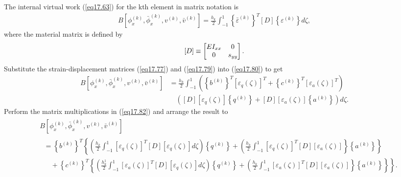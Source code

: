 \documentclass{AeroStructure-ERJohnson}
\begin{document}
The internal virtual work (\ref{eq17.63}) for the kth element in matrix notation is
\begin{align}\label{eq17.80}
B\left[\phi_{x}^{(k)}, \bar{\phi}_{x}^{(k)}, v^{(k)}, \bar{v}^{(k)}\right]=\frac{h_{k}}{2} \int_{-1}^{1}\left\{\bar{\varepsilon}^{(k)}\right\}^{T}[D]\left\{\varepsilon^{(k)}\right\} d \zeta,
\end{align}
where the material matrix is defined by\vspace*{-4pt}
\begin{align}\label{eq17.81}
[D] \equiv\left[\begin{array}{@{}cc@{}}E I_{x x} & 0 \\0 & s_{y y}\end{array}\right].
\end{align}
Substitute the strain-displacement matrices (\ref{eq17.77}) and (\ref{eq17.79}) into (\ref{eq17.80}) to get
\begin{align}
B\left[\phi_{x}^{(k)}, \bar{\phi}_{x}^{(k)}, v^{(k)}, \bar{v}^{(k)}\right] &=\frac{h_{k}}{2} \int_{-1}^{1}\left(\left\{b^{(k)}\right\}^{T}\left[\varepsilon_{q}(\zeta)\right]^{T}+\left\{c^{(k)}\right\}^{T}\left[\varepsilon_{a}(\zeta)\right]^{T}\right)\nonumber \\
&\quad\left([D]\left[\varepsilon_{q}(\zeta)\right]\left\{q^{(k)}\right\}  +[D]\left[\varepsilon_{a}(\zeta)\right]\left\{a^{(k)}\right\}\right) d \zeta. \label{eq17.82}
\end{align}
Perform the matrix multiplications in (\ref{eq17.82}) and arrange the result to
\begin{align}\label{eq17.83}
&\begin{array}{rl}B\left[\phi_{x}^{(k)}, \bar{\phi}_{x}^{(k)}, v^{(k)}, \bar{v}^{(k)}\right]\end{array}\nonumber\\
&\quad =
\left\{b^{(k)}\right\}^{T}\left\{\left(\frac{h_{k}}{2} \int^{1}_{-1}\left[\varepsilon_{q}(\zeta)\right]^{T}[D]\left[\varepsilon_{q}(\zeta)\right] d \zeta\right)\left\{q^{(k)}\right\}+\left(\frac{h_{k}}{2} \int^{1}_{-1}\left[\varepsilon_{q}(\zeta)\right]^{T}[D]\left[\varepsilon_{a}(\zeta)\right]\right\}\left\{a^{(k)}\right\}\right\} \nonumber\\
&\quad\quad\!\!+ \left. \left\{c^{(k)}\right\}^{T}\left\{\left(\frac{h_{k}^{1}}{2} \int^{1}_{-1}\left[\varepsilon_{a}(\zeta)\right]^{T}[D]\left[\varepsilon_{q}(\zeta)\right] d \zeta\right)\left\{q^{(k)}\right\}+\left(\frac{h_{k}}{2} \int^{1}_{-1}\left[\varepsilon_{a}(\zeta)\right]^{T}[D]\left[\varepsilon_{a}(\zeta)\right]\right\}\left\{a^{(k)}\right\}\right\}
\right\}.
\end{align}
\end{document}
